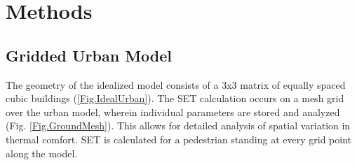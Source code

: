 \documentclass[preprint,3p,12pt,english]{elsarticle}
\begin{document}
%
%
%
%



\begin{table}[!t]
  \begin{framed}
  \footnotesize
    \printnomenclature
  \end{framed}
\end{table}


\section{Methods}
\subsection{Gridded Urban Model}
The geometry of the idealized model consists of a 3x3 matrix of equally spaced cubic buildings (\ref{Fig.IdealUrban}). The SET calculation occurs on a mesh grid over the urban model, wherein individual parameters are stored and analyzed  (Fig. \ref{Fig.GroundMesh}). This allows for detailed analysis of spatial variation in thermal comfort. SET is calculated for a pedestrian standing at every grid point along the model.
\end{document}
